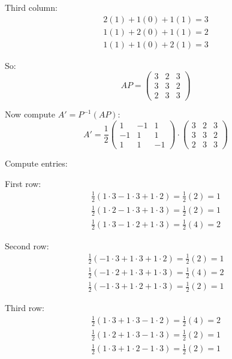 \documentclass[12pt]{article}
\begin{document}
\begin{answerbox}
\begin{enumerate}
\begin{enumerate}
        Third column:
        $$
        \begin{aligned}
        2(1) + 1(0) + 1(1) = 3 \\
        1(1) + 2(0) + 1(1) = 2 \\
        1(1) + 1(0) + 2(1) = 3
        \end{aligned}
        $$

        So:
        $$
        AP = \begin{pmatrix}
        3 & 2 & 3 \\
        3 & 3 & 2 \\
        2 & 3 & 3
        \end{pmatrix}
        $$

        Now compute $ A' = P^{-1} (AP) $:
        $$
        A' = \frac{1}{2}
        \begin{pmatrix}
        1 & -1 & 1 \\
        -1 & 1 & 1 \\
        1 & 1 & -1
        \end{pmatrix}
        \cdot
        \begin{pmatrix}
        3 & 2 & 3 \\
        3 & 3 & 2 \\
        2 & 3 & 3
        \end{pmatrix}
        $$

        Compute entries:

        First row:
        $$
        \begin{aligned}
        \frac{1}{2}(1 \cdot 3 - 1 \cdot 3 + 1 \cdot 2) = \frac{1}{2}(2) = 1 \\
        \frac{1}{2}(1 \cdot 2 - 1 \cdot 3 + 1 \cdot 3) = \frac{1}{2}(2) = 1 \\
        \frac{1}{2}(1 \cdot 3 - 1 \cdot 2 + 1 \cdot 3) = \frac{1}{2}(4) = 2
        \end{aligned}
        $$

        Second row:
        $$
        \begin{aligned}
        \frac{1}{2}(-1 \cdot 3 + 1 \cdot 3 + 1 \cdot 2) = \frac{1}{2}(2) = 1 \\
        \frac{1}{2}(-1 \cdot 2 + 1 \cdot 3 + 1 \cdot 3) = \frac{1}{2}(4) = 2 \\
        \frac{1}{2}(-1 \cdot 3 + 1 \cdot 2 + 1 \cdot 3) = \frac{1}{2}(2) = 1
        \end{aligned}
        $$

        Third row:
        $$
        \begin{aligned}
        \frac{1}{2}(1 \cdot 3 + 1 \cdot 3 - 1 \cdot 2) = \frac{1}{2}(4) = 2 \\
        \frac{1}{2}(1 \cdot 2 + 1 \cdot 3 - 1 \cdot 3) = \frac{1}{2}(2) = 1 \\
        \frac{1}{2}(1 \cdot 3 + 1 \cdot 2 - 1 \cdot 3) = \frac{1}{2}(2) = 1
        \end{aligned}
        $$


\end{enumerate}
\end{enumerate}
\end{answerbox}
\end{document}
